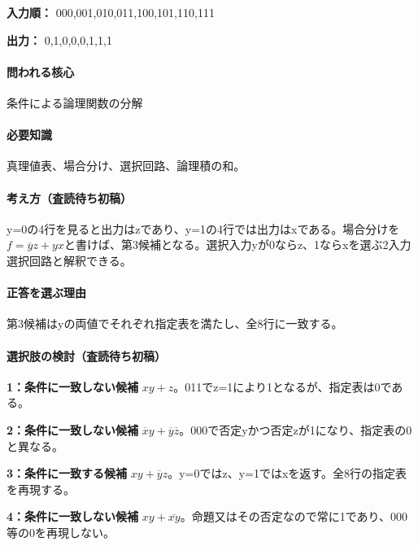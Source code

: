 \noindent\textbf{入力順：} 000,001,010,011,100,101,110,111\par

\noindent\textbf{出力：} 0,1,0,0,0,1,1,1\par

\paragraph{問われる核心} 条件による論理関数の分解

\paragraph{必要知識} 真理値表、場合分け、選択回路、論理積の和。

\paragraph{考え方（査読待ち初稿）} y=\allowbreak{}0の4行を見ると出力はzであり、y=\allowbreak{}1の4行では出力はxである。場合分けを\(f=\overline y z+yx\)と書けば、第3候補となる。選択入力yが0ならz、1ならxを選ぶ2入力選択回路と解釈できる。

\paragraph{正答を選ぶ理由} 第3候補はyの両値でそれぞれ指定表を満たし、全8行に一致する。

\paragraph{選択肢の検討（査読待ち初稿）}\mbox{}\par

\noindent\textbf{1：条件に一致しない候補} \(xy+z\)。011でz=\allowbreak{}1により1となるが、指定表は0である。\par

\noindent\textbf{2：条件に一致しない候補} \(\overline x y+\overline y\overline z\)。000で否定yかつ否定zが1になり、指定表の0と異なる。\par

\noindent\textbf{3：条件に一致する候補} \(xy+\overline y z\)。y=\allowbreak{}0ではz、y=\allowbreak{}1ではxを返す。全8行の指定表を再現する。\par

\noindent\textbf{4：条件に一致しない候補} \(xy+\overline{xy}\)。命題又はその否定なので常に1であり、000等の0を再現しない。\par

